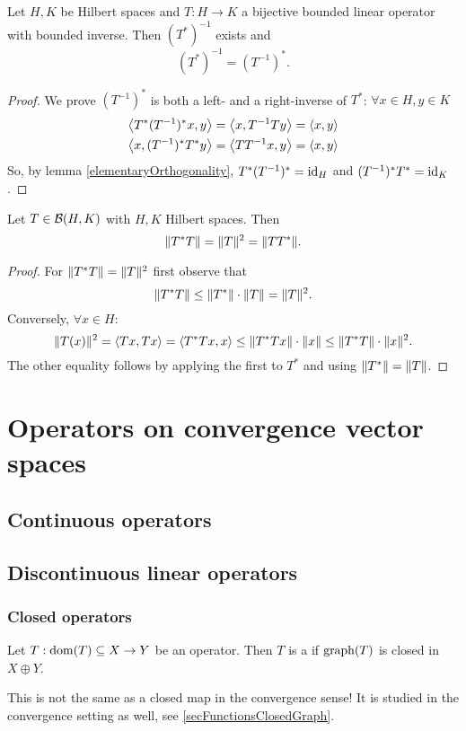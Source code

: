\begin{proposition}
Let $H,K$ be Hilbert spaces and $T:H\to K$ a bijective bounded linear operator with bounded inverse. Then $(T^*)^{-1}$ exists and
\[ (T^*)^{-1} = (T^{-1})^*. \]
\end{proposition}
\begin{proof}
We prove $(T^{-1})^*$ is both a left- and a right-inverse of $T^*$: $\forall x\in H, y\in K$
\begin{align*}
\inner{T^*(T^{-1})^*x,y} &= \inner{x,T^{-1}Ty} = \inner{x,y} \\
\inner{x,(T^{-1})^*T^*y} &= \inner{TT^{-1}x,y} = \inner{x,y}
\end{align*}
So, by lemma \ref{elementaryOrthogonality}, $T^*(T^{-1})^* = \operatorname{id}_H$ and $(T^{-1})^*T^* = \operatorname{id}_K$.
\end{proof}

\begin{proposition} \label{normOfSquare}
Let $T\in \operatorname{\mathcal{B}}(H,K)$ with $H,K$ Hilbert spaces. Then
\[ \lVert T^*T\rVert= \lVert T\rVert^2 = \lVert TT^*\rVert. \]
\end{proposition}
\begin{proof}
For $\lVert T^*T\rVert= \lVert T\rVert^2$ first observe that
\[ \lVert T^*T\rVert \leq \lVert T^*\rVert\cdot\lVert T\rVert = \lVert T\rVert^2. \]
Conversely, $\forall x\in H$:
\[ \norm{T(x)}^2 = \inner{Tx,Tx} = \inner{T^*Tx,x} \leq \norm{T^*Tx}\cdot \norm{x} \leq \norm{T^*T}\cdot\norm{x}^2. \]
The other equality follows by applying the first to $T^*$ and using $\lVert T^*\rVert=\lVert T\rVert$.
\end{proof}

\chapter{Operators on convergence vector spaces}

\section{Continuous operators}

\section{Discontinuous linear operators}
\subsection{Closed operators}
\begin{definition}
Let $T:\operatorname{dom}(T)\subseteq X\to Y$ be an operator. Then $T$ is a  if $\operatorname{graph}(T)$ is closed in $X\oplus Y$.
\end{definition}
This is not the same as a closed map in the convergence sense! It is studied in the convergence setting as well, see \ref{secFunctionsClosedGraph}.

